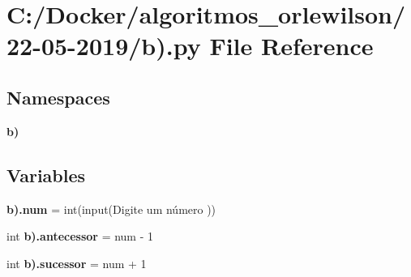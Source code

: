 \section{C\+:/\+Docker/algoritmos\+\_\+orlewilson/22-\/05-\/2019/b).py File Reference}
\label{b_08_8py}
\subsection*{Namespaces}
\begin{DoxyCompactItemize}
\item 
 \textbf{ b)}
\end{DoxyCompactItemize}
\subsection*{Variables}
\begin{DoxyCompactItemize}
\item 
\textbf{ b).\+num} = int(input(\textquotesingle{}Digite um número \textquotesingle{}))
\item 
int \textbf{ b).\+antecessor} = num -\/ 1
\item 
int \textbf{ b).\+sucessor} = num + 1
\end{DoxyCompactItemize}

